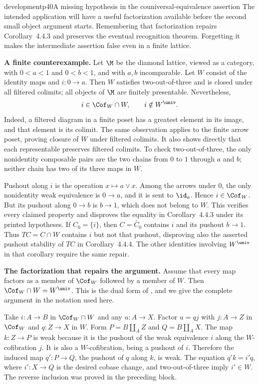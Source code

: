 \begin{dcomment}{development}{p40}{A missing hypothesis in the couniversal-equivalence assertion}
The intended application will have a useful factorization available before the second small object argument starts. Remembering that factorization repairs Corollary~4.4.3 and preserves the eventual recognition theorem. Forgetting it makes the intermediate assertion false even in a finite lattice.

\textbf{A finite counterexample.}\ours
Let $\M$ be the diamond lattice, viewed as a category, with $0<a<1$ and $0<b<1$, and with $a,b$ incomparable. Let $W$ consist of the identity maps and $i:0\to a$. Then $W$ satisfies two-out-of-three and is closed under all filtered colimits; all objects of $\M$ are finitely presentable. Nevertheless,
\[
i\in\Cof_W\cap W,\qquad i\notin W^{\univ}.
\]
Indeed, a filtered diagram in a finite poset has a greatest element in its image, and that element is its colimit. The same observation applies to the finite arrow poset, proving closure of $W$ under filtered colimits. It also shows directly that each representable preserves filtered colimits. To check two-out-of-three, the only nonidentity composable pairs are the two chains from $0$ to $1$ through $a$ and $b$; neither chain has two of its three maps in $W$.

Pushout along $i$ is the operation $x\mapsto a\vee x$. Among the arrows under $0$, the only nonidentity weak equivalence is $0\to a$, and it is sent to $\id_a$. Hence $i\in\Cof_W$. But its pushout along $0\to b$ is $b\to1$, which does not belong to $W$. This verifies every claimed property and disproves the equality in Corollary~4.4.3 under its printed hypotheses. If $C_0=\{i\}$, then $C=\widetilde{C_0}$ contains $i$ and its pushout $b\to1$. Thus $TC=C\cap W$ contains $i$ but not that pushout, disproving also the asserted pushout stability of $TC$ in Corollary~4.4.4. The other identities involving $W^{\univ}$ in that corollary require the same repair.

\textbf{The factorization that repairs the argument.}
Assume that every map factors as a member of $\Cof_W$ followed by a member of $W$. Then $\Cof_W\cap W=W^{\univ}$. This is the dual form of \citet[Chapter~XIII, Proposition~4, ms.~pp.~10--11]{GrothendieckDerivateursXIII}, and we give the complete argument in the notation used here.

Take $i:A\to B$ in $\Cof_W\cap W$ and any $u:A\to X$. Factor $u=qj$ with $j:A\to Z$ in $\Cof_W$ and $q:Z\to X$ in $W$. Form $P=B\amalg_A Z$ and $Q=B\amalg_A X$. The map $k:Z\to P$ is weak because it is the pushout of the weak equivalence $i$ along the $W$-cofibration $j$. It is also a $W$-cofibration, being a pushout of $i$. Therefore the induced map $q':P\to Q$, the pushout of $q$ along $k$, is weak. The equation $q'k=i'q$, where $i':X\to Q$ is the desired cobase change, and two-out-of-three imply $i'\in W$. The reverse inclusion was proved in the preceding block.


\end{dcomment}
